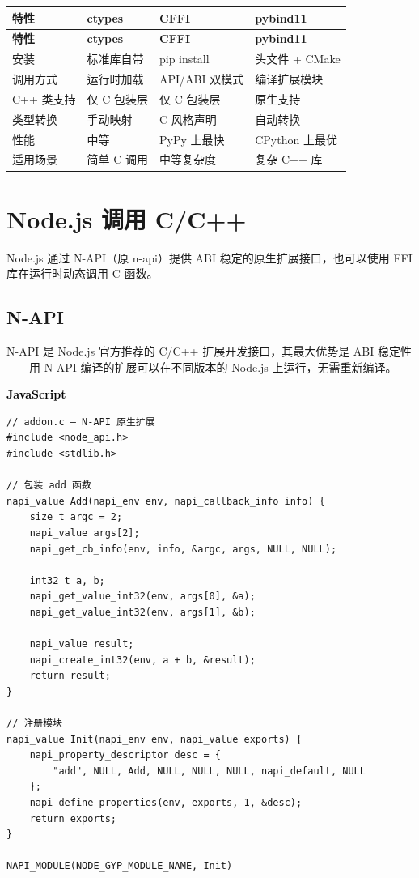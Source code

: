 \documentclass[12pt,a4paper,fontset=fandol]{ctexbook}
\newcommand{\jslabel}{%
  \begin{tcolorbox}[enhanced,colback=jsheadbg,colframe=jsheadbg,
    arc=1mm,boxrule=0mm,left=6pt,right=6pt,top=2pt,bottom=2pt,
    halign=left,oversize]
    \textcolor{black}{\small\bfseries JavaScript}
  \end{tcolorbox}\vspace{-4pt}}
\newcommand{\cpp}[1]{C++#1}
\begin{document}
\begin{tcolorbox}[compare={ctypes vs CFFI vs pybind11}]
\begin{longtable}{lp{3.2cm}p{3.2cm}p{3.2cm}}
\toprule
\textbf{特性} & \textbf{ctypes} & \textbf{CFFI} & \textbf{pybind11} \\
\midrule
\endfirsthead
\toprule
\textbf{特性} & \textbf{ctypes} & \textbf{CFFI} & \textbf{pybind11} \\
\midrule
\endhead
安装            & 标准库自带      & pip install    & 头文件 + CMake \\
调用方式        & 运行时加载      & API/ABI 双模式 & 编译扩展模块   \\
\cpp{} 类支持   & 仅 C 包装层     & 仅 C 包装层    & 原生支持       \\
类型转换        & 手动映射        & C 风格声明     & 自动转换       \\
性能            & 中等            & PyPy 上最快    & CPython 上最优 \\
适用场景        & 简单 C 调用     & 中等复杂度     & 复杂 \cpp{} 库 \\
\bottomrule
\end{longtable}
\end{tcolorbox}


\chapter{Node.js 调用 C/C++}

Node.js 通过 N-API（原 n-api）提供 ABI 稳定的原生扩展接口，也可以使用 FFI 库在运行时动态调用 C 函数。

\section{N-API}

N-API 是 Node.js 官方推荐的 C/\allowbreak{}\cpp{} 扩展开发接口，其最大优势是 ABI 稳定性——用 N-API 编译的扩展可以在不同版本的 Node.js 上运行，无需重新编译。

\jslabel
\begin{lstlisting}[style=jsstyle]
// addon.c — N-API 原生扩展
#include <node_api.h>
#include <stdlib.h>

// 包装 add 函数
napi_value Add(napi_env env, napi_callback_info info) {
    size_t argc = 2;
    napi_value args[2];
    napi_get_cb_info(env, info, &argc, args, NULL, NULL);

    int32_t a, b;
    napi_get_value_int32(env, args[0], &a);
    napi_get_value_int32(env, args[1], &b);

    napi_value result;
    napi_create_int32(env, a + b, &result);
    return result;
}

// 注册模块
napi_value Init(napi_env env, napi_value exports) {
    napi_property_descriptor desc = {
        "add", NULL, Add, NULL, NULL, NULL, napi_default, NULL
    };
    napi_define_properties(env, exports, 1, &desc);
    return exports;
}

NAPI_MODULE(NODE_GYP_MODULE_NAME, Init)
\end{lstlisting}
\end{document}
